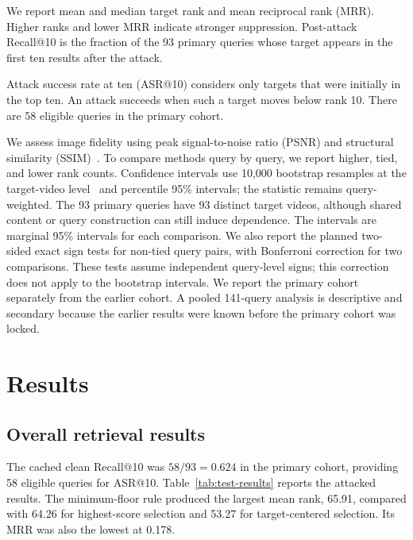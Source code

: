 \documentclass[runningheads]{llncs}
\begin{document}
We report mean and median target rank and mean reciprocal rank (MRR). Higher ranks and lower MRR indicate stronger suppression. Post-attack Recall@10 is the fraction of the 93 primary queries whose target appears in the first ten results after the attack.

Attack success rate at ten (ASR@10) considers only targets that were initially in the top ten. An attack succeeds when such a target moves below rank 10. There are 58 eligible queries in the primary cohort.

We assess image fidelity using peak signal-to-noise ratio (PSNR) and structural similarity (SSIM)~\cite{wang2004ssim}. To compare methods query by query, we report higher, tied, and lower rank counts. Confidence intervals use 10,000 bootstrap resamples at the target-video level~\cite{field2007bootstrap} and percentile 95\% intervals; the statistic remains query-weighted. The 93 primary queries have 93 distinct target videos, although shared content or query construction can still induce dependence. The intervals are marginal 95\% intervals for each comparison. We also report the planned two-sided exact sign tests for non-tied query pairs, with Bonferroni correction for two comparisons. These tests assume independent query-level signs; this correction does not apply to the bootstrap intervals. We report the primary cohort separately from the earlier cohort. A pooled 141-query analysis is descriptive and secondary because the earlier results were known before the primary cohort was locked.

\FloatBarrier
\section{Results}

\subsection{Overall retrieval results}

The cached clean Recall@10 was $58/93=0.624$ in the primary cohort, providing 58 eligible queries for ASR@10. Table~\ref{tab:test-results} reports the attacked results. The minimum-floor rule produced the largest mean rank, 65.91, compared with 64.26 for highest-score selection and 53.27 for target-centered selection. Its MRR was also the lowest at 0.178.
\end{document}
